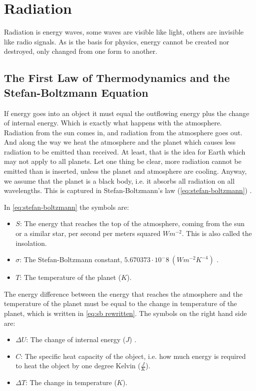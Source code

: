 \section{Radiation} \label{sec:rad}
Radiation is energy waves, some waves are visible like light, others are invisible like radio signals. As is the basis for physics, energy cannot be created nor destroyed, only changed from one
form to another.

\subsection{The First Law of Thermodynamics and the Stefan-Boltzmann Equation} \label{sec:first thermolaw}
If energy goes into an object it must equal the outflowing energy plus the change of internal energy. Which is exactly what happens with the atmosphere. Radiation from the sun comes in, and 
radiation from the atmosphere goes out. And along the way we heat the atmosphere and the planet which causes less radiation to be emitted than received. At least, that is the idea for Earth which
may not apply to all planets. Let one thing be clear, more radiation cannot be emitted than is inserted, unless the planet and atmosphere are cooling. Anyway, we assume that the planet is a black 
body, i.e. it absorbs all radiation on all wavelengths. This is captured in Stefan-Boltzmann's law (\autoref{eq:stefan-boltzmann}) \cite{stefan-boltzmann}. 

In \autoref{eq:stefan-boltzmann} the symbols are:

\begin{itemize}
    \item $S$: The energy that reaches the top of the atmosphere, coming from the sun or a similar star, per second per meters squared $Wm^{-2}$. This is also called the insolation.
    \item $\sigma$: The Stefan-Boltzmann constant, $5.670373 \cdot 10^-8 \ (Wm^{-2}K^{-4})$ \cite{stefan-boltzmann}.
    \item $T$: The temperature of the planet ($K$).
\end{itemize}

The energy difference between the energy that reaches the atmosphere and the temperature of the planet must be equal to the change in temperature of the planet, which is written in 
\autoref{eq:sb rewritten}. The symbols on the right hand side are:

\begin{itemize}
    \item $\Delta U$: The change of internal energy ($J$) \cite{thermo1}.
    \item $C$: The specific heat capacity of the object, i.e. how much energy is required to heat the object by one degree Kelvin ($\frac{J}{K}$).
    \item $\Delta T$: The change in temperature ($K$).
\end{itemize}

